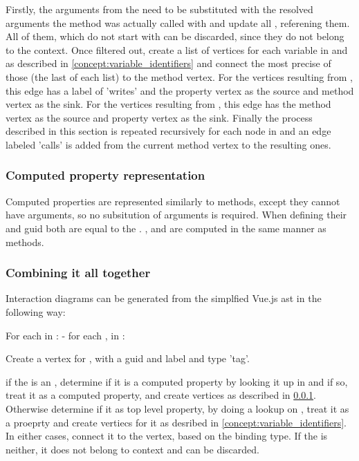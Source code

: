 Firstly, the arguments from the  need to be substituted with the resolved arguments the method was actually called with and update all ,    referening them. All of them, which do not start with  can be discarded, since they do not belong to the context. Once filtered out, create a list of vertices for each variable in  and  as described in \ref{concept:variable_identifiers} and connect the most precise of those (the last of each list) to the method vertex. For the vertices resulting from , this edge has a label of 'writes' and the property vertex as the source and method vertex as the sink. For the vertices resulting from , this edge has the method vertex as the source and property vertex as the sink. 
Finally the process described in this section is repeated recursively for each  node in  and an edge labeled 'calls' is added from the current method vertex to the resulting ones. 

\subsubsection{Computed property representation}
\label{concept:computed_property}

Computed properties are represented similarly to methods, except they cannot have arguments, so no subsitution of arguments is required. When defining their  and \gls{guid} both are equal to the . ,  and  are computed in the same manner as methods. 

\subsubsection{Combining it all together}
\label{concept:algorithm_create_diagrams}

Interaction diagrams can be generated from the simplfied Vue.js \gls{ast} in the following way:

For each  in :
- for each ,   in :

Create a vertex for , with a \gls{guid}  and label  and type 'tag'.

if the  is an , determine if it is a computed property by looking it up in  and if so, treat it as a computed property, and create vertices as described in \ref{concept:computed_property}. Otherwise determine if it as top level property, by doing a lookup on , treat it as a proeprty and create vertiecs for it as desribed in \ref{concept:variable_identifiers}. In either cases, connect it to the  vertex, based on the binding type. If the  is neither, it does not belong to context and can be discarded. %

